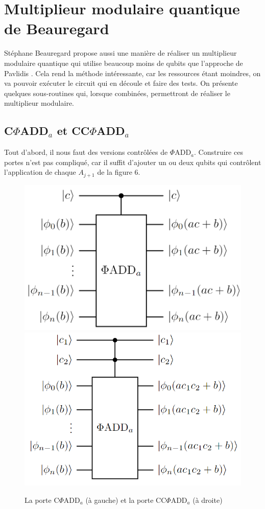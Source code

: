 \section{Multiplieur modulaire quantique de Beauregard}
Stéphane Beauregard propose aussi une manière de réaliser un multiplieur modulaire quantique qui utilise beaucoup moins de qubits que l'approche de Pavlidis \cite{beauregard2003circuitshorsalgorithmusing}. Cela rend la méthode intéressante, car les ressources étant moindres, on va pouvoir exécuter le circuit qui en découle et faire des tests. On présente quelques sous-routines qui, lorsque combinées, permettront de réaliser le multiplieur modulaire.

\subsection{C$\Phi$ADD$_a$ et CC$\Phi$ADD$_a$}
Tout d'abord, il nous faut des versions contrôlées de $\Phi$ADD$_a$. Construire ces portes n'est pas compliqué, car il suffit d'ajouter un ou deux qubits qui contrôlent l'application de chaque $A_{j+1}$ de la figure 6.

\begin{figure}[H]
    \begin{center}
        \includegraphics[scale=0.31]{images/cphiadd.png} 
        \includegraphics[scale=0.46]{images/ccphiadd.png}
        \caption{La porte C$\Phi$ADD$_a$ (à gauche) et la porte  CC$\Phi$ADD$_a$ (à droite)}   
    \end{center}
\end{figure}

